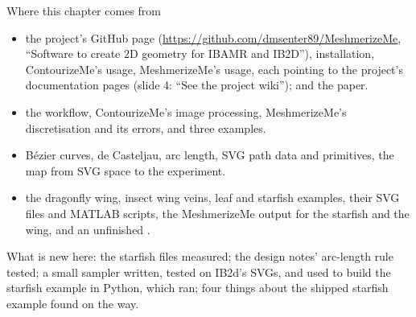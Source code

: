 \documentclass[aspectratio=169,11pt]{beamer}
\begin{document}
\begin{frame}{Where this chapter comes from}
\label{fr:sources}
\footnotesize
\begin{itemize}
  \item {} the project's GitHub page (\url{https://github.com/dmsenter89/MeshmerizeMe}, ``Software to create 2D geometry for IBAMR and IB2D''), installation, ContourizeMe's usage, MeshmerizeMe's usage, each pointing to the project's documentation pages (slide 4: ``See the project wiki''); and the paper.
  \item {} the workflow, ContourizeMe's image processing, MeshmerizeMe's discretisation and its errors, and three examples.
  \item {} B\'ezier curves, de Casteljau, arc length, SVG path data and primitives, the map from SVG space to the experiment.
  \item {} the dragonfly wing, insect wing veins, leaf and starfish examples, their SVG files and MATLAB scripts, the MeshmerizeMe output for the starfish and the wing, and an unfinished .
\end{itemize}
What is new here: the starfish files measured; the design notes' arc-length rule tested; a small sampler written, tested on IB2d's SVGs, and used to build the starfish example in Python, which ran; four things about the shipped starfish example found on the way.
\end{frame}
\end{document}

